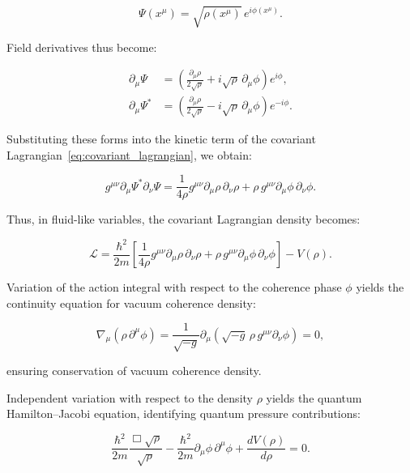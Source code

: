 \begin{equation}
\Psi(x^\mu) = \sqrt{\rho(x^\mu)}\,e^{i\phi(x^\mu)}.
\label{eq:madelung_transformation}
\end{equation}

Field derivatives thus become:

\begin{align}
\partial_\mu\Psi &= \left(\frac{\partial_\mu\rho}{2\sqrt{\rho}} + i\sqrt{\rho}\,\partial_\mu\phi\right)e^{i\phi},\label{eq:madelung_derivative}\\[6pt]
\partial_\mu\Psi^* &= \left(\frac{\partial_\mu\rho}{2\sqrt{\rho}} - i\sqrt{\rho}\,\partial_\mu\phi\right)e^{-i\phi}.
\label{eq:madelung_derivative_conj}
\end{align}

Substituting these forms into the kinetic term of the covariant Lagrangian~\eqref{eq:covariant_lagrangian}, we obtain:

\begin{equation}
g^{\mu\nu}\partial_\mu\Psi^*\partial_\nu\Psi = \frac{1}{4\rho}g^{\mu\nu}\partial_\mu\rho\,\partial_\nu\rho + \rho\,g^{\mu\nu}\partial_\mu\phi\,\partial_\nu\phi.
\label{eq:kinetic_expanded}
\end{equation}

Thus, in fluid-like variables, the covariant Lagrangian density becomes:

\begin{equation}
\mathcal{L} = \frac{\hbar^2}{2m}\left[\frac{1}{4\rho}g^{\mu\nu}\partial_\mu\rho\,\partial_\nu\rho + \rho\,g^{\mu\nu}\partial_\mu\phi\,\partial_\nu\phi\right]-V(\rho).
\label{eq:lagrangian_fluid}
\end{equation}

Variation of the action integral with respect to the coherence phase \(\phi\) yields the continuity equation for vacuum coherence density:

\begin{equation}
\nabla_\mu(\rho\,\partial^\mu\phi) = \frac{1}{\sqrt{-g}}\partial_\mu(\sqrt{-g}\,\rho\,g^{\mu\nu}\partial_\nu\phi) = 0,
\label{eq:continuity}
\end{equation}

ensuring conservation of vacuum coherence density.

Independent variation with respect to the density \(\rho\) yields the quantum Hamilton–Jacobi equation, identifying quantum pressure contributions:

\begin{equation}
\frac{\hbar^2}{2m}\frac{\Box\sqrt{\rho}}{\sqrt{\rho}} - \frac{\hbar^2}{2m}\partial_\mu\phi\,\partial^\mu\phi + \frac{dV(\rho)}{d\rho} = 0.
\label{eq:hamilton_jacobi_detailed}
\end{equation}

